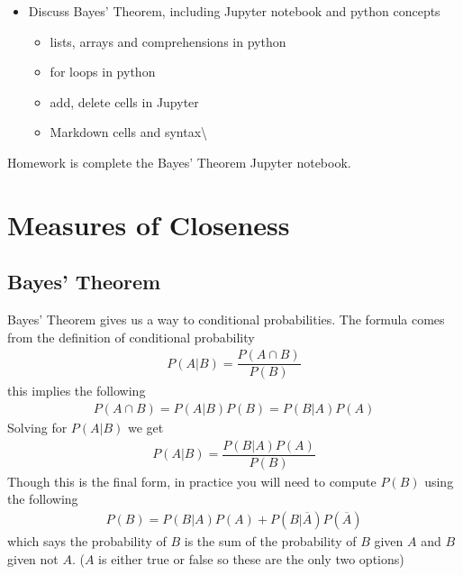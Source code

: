 \documentclass[letterpaper,10pt,english]{jupyterBook}
\begin{document}
\begin{itemize}
\item {} 
\sphinxAtStartPar
Discuss Bayes’ Theorem, including Jupyter notebook and python concepts
\begin{itemize}
\item {} 
\sphinxAtStartPar
lists, arrays and comprehensions in python

\item {} 
\sphinxAtStartPar
for loops in python

\item {} 
\sphinxAtStartPar
add, delete cells in Jupyter

\item {} 
\sphinxAtStartPar
Markdown cells and syntax\textbackslash{}

\end{itemize}

\end{itemize}

\sphinxAtStartPar
Homework is complete the Bayes’ Theorem Jupyter notebook.

\sphinxstepscope


\part{Measures of Closeness}

\sphinxstepscope


\chapter{Bayes’ Theorem}
\label{\detokenize{lessons/Bayes_Theorem_Student:bayes-theorem}}\label{\detokenize{lessons/Bayes_Theorem_Student::doc}}
\sphinxAtStartPar
Bayes’ Theorem gives us a way to  conditional probabilities. The formula comes from the definition of conditional probability
\begin{equation*}
\begin{split}P(A|B) = \dfrac{P(A \cap B)}{P(B)}\end{split}
\end{equation*}
\sphinxAtStartPar
this implies the following
\begin{equation*}
\begin{split}P(A \cap B) = P(A|B)P(B) = P(B|A)P(A)\end{split}
\end{equation*}
\sphinxAtStartPar
Solving for \(P(A|B)\) we get
\begin{equation*}
\begin{split}P(A|B) = \dfrac{P(B|A)P(A)}{P(B)}\end{split}
\end{equation*}
\sphinxAtStartPar
Though this is the final form, in practice you will need to compute \(P(B)\) using the following
\begin{equation*}
\begin{split}P(B) = P(B|A)P(A) + P(B|\overline{A})P(\overline{A})\end{split}
\end{equation*}
\sphinxAtStartPar
which says the probability of \(B\) is the sum of the probability of \(B\) given \(A\) and \(B\) given not \(A\). (\(A\) is either true or false so these are the only two options)
\end{document}
